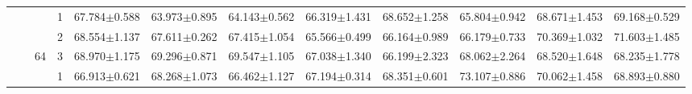 \begin{table}[htpb]
{\begin{tabular}{c|c|c|c|rr|rr|rr|rr}
                                 &                                                                                 &                                                                                        & 1                                                                                         & 67.784$\pm$0.588                        & 63.973$\pm$0.895                        & 64.143$\pm$0.562                        & 66.319$\pm$1.431                        & 68.652$\pm$1.258                        & 65.804$\pm$0.942                        & 68.671$\pm$1.453                        & 69.168$\pm$0.529                       \\
                                 &                                                                                 &                                                                                        & 2                                                                                         & 68.554$\pm$1.137                        & 67.611$\pm$0.262                        & 67.415$\pm$1.054                        & 65.566$\pm$0.499                        & 66.164$\pm$0.989                        & 66.179$\pm$0.733                        & 70.369$\pm$1.032                        & 71.603$\pm$1.485                       \\
                                 &                                                                                 & \multirow{-3}{*}{64}                                                                   & 3                                                                                         & 68.970$\pm$1.175                        & 69.296$\pm$0.871                        & 69.547$\pm$1.105                        & 67.038$\pm$1.340                        & 66.199$\pm$2.323                        & 68.062$\pm$2.264                        & 68.520$\pm$1.648                        & 68.235$\pm$1.778                       \\ \cline{3-12} 
                                 &                                                                                 &                                                                                        & 1                                                                                         & 66.913$\pm$0.621                        & 68.268$\pm$1.073                        & 66.462$\pm$1.127                        & 67.194$\pm$0.314                        & 68.351$\pm$0.601                        & 73.107$\pm$0.886                        & 70.062$\pm$1.458                        & 68.893$\pm$0.880                       \\

\end{tabular}}
\end{table}
